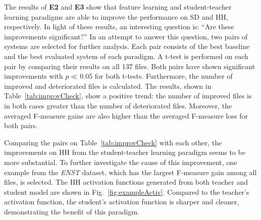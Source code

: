 \documentclass{article}
\begin{document}




The results of \textbf{E2} and \textbf{E3} show that feature learning and student-teacher learning paradigms are able to improve the performance on SD and HH, respectively. In light of these results, an interesting question is: ``Are these improvements significant?'' In an attempt to answer this question, two pairs of systems are selected for further analysis. Each pair consists of the best baseline and the best evaluated system of each paradigm. A t-test is performed on each pair by comparing their results on all 137 files. Both pairs have shown significant improvements with $p \ll 0.05$ for both t-tests. Furthermore, the number of improved and deteriorated files is calculated. The results, shown in Table~\ref{tab:improvCheck}, show a positive trend: the number of improved files is in both cases greater than the number of deteriorated files. Moreover, the averaged F-measure gains are also higher than the averaged F-measure loss for both pairs.  

Comparing the pairs on Table~\ref{tab:improvCheck} with each other, the improvements on HH from the student-teacher learning paradigm seems to be more substantial. To further investigate the cause of this improvement, one example from the \textit{ENST} dataset, which has the largest F-measure gain among all files, is selected. The HH activation functions generated from both teacher and student model are shown in Fig.~\ref{fig:exampleActiv}. Compared to the teacher's activation function, the student's activation function is sharper and cleaner, demonstrating the benefit of this paradigm.
\end{document}
